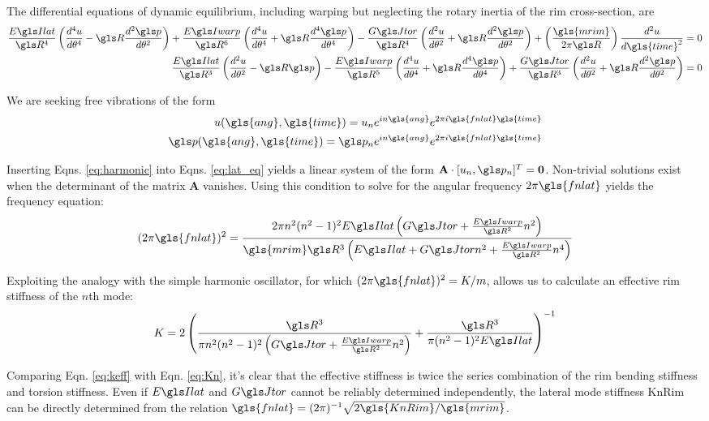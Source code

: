 \documentclass[../thesis.tex]{subfiles}
\begin{document}
The differential equations of dynamic equilibrium, including warping but neglecting the rotary inertia of the rim cross-section, are
  \begin{subequations}\label{eq:lat_eq}
  \begin{align}
  \frac{\EIl}{\R^4}\left(\dt{u}{4} - \R\dt{\p}{2}\right) +
  \frac{\EIw}{\R^6} \left(\dt{u}{4} + \R\dt{\p}{4}\right) -
  \frac{\GJ}{\R^4}\left(\dt{u}{2} + \R\dt{\p}{2}\right) +
  \left(\frac{\gls{mrim}}{2\pi \R}\right) \frac{d^2u}{d\gls{time}^2} = 0\\
  \frac{\EIl}{\R^3}\left(\dt{u}{2} - \R\p\right) -
  \frac{\EIw}{\R^5}\left(\dt{u}{4} + \R\dt{\p}{4}\right) +
  \frac{\GJ}{\R^3}\left(\dt{u}{2} + \R\dt{\p}{2}\right) = 0
  \end{align}
  \end{subequations}

We are seeking free vibrations of the form
  \begin{subequations}\label{eq:harmonic}
  \begin{align}
  u(\gls{ang}, \gls{time})=u_n e^{in\gls{ang}}e^{2\pi i \gls{fnlat} \gls{time}}\\
  \p(\gls{ang}, \gls{time})=\p_n e^{in\gls{ang}}e^{2\pi i \gls{fnlat} \gls{time}}
  \end{align}
  \end{subequations}

Inserting Eqns. \eqref{eq:harmonic} into Eqns. \eqref{eq:lat_eq} yields a linear system of the form $\mathbf{A}\cdot [u_n, \p_n]^T=\mathbf{0}$. Non-trivial solutions exist when the determinant of the matrix $\mathbf{A}$ vanishes. Using this condition to solve for the angular frequency $2\pi \gls{fnlat}$ yields the frequency equation:
  \begin{equation}\label{eq:lat_freq_eq}
  (2\pi \gls{fnlat})^2 = \frac{2\pi n^2(n^2-1)^2\EIl\left(\GJ + \frac{\EIw}{\R^2}n^2 \right)}
                  {\gls{mrim} \R^3 \left( \EIl + \GJ n^2 + \frac{\EIw}{\R^2}n^4\right)}
  \end{equation}

Exploiting the analogy with the simple harmonic oscillator, for which $(2\pi \gls{fnlat})^2=K/m$, allows us to calculate an effective rim stiffness of the $n$th mode:
\begin{equation}\label{eq:keff}
K = 2 \left( \frac{\R^3}{\pi n^2(n^2-1)^2\left( \GJ + \frac{\EIw}{\R^2}n^2\right)} +
  \frac{\R^3}{\pi(n^2-1)^2\EIl} \right)^{-1}
\end{equation}

Comparing Eqn. \eqref{eq:keff} with Eqn. \eqref{eq:Kn}, it's clear that the effective stiffness is twice the series combination of the rim bending stiffness and torsion stiffness. Even if $\EIl$ and $\GJ$ cannot be reliably determined independently, the lateral mode stiffness \gls{KnRim} can be directly determined from the relation $\gls{fnlat} = (2\pi)^{-1}\sqrt{2\gls{KnRim}/\gls{mrim}}$.
\end{document}
